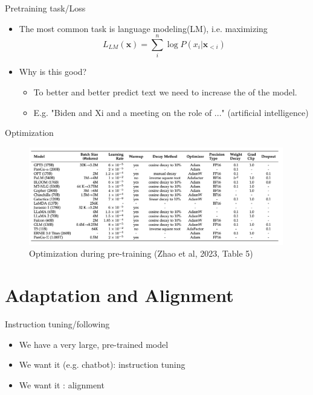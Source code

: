 \documentclass[10pt]{beamer}
\begin{document}
\begin{frame}{Pretraining task/Loss}

\begin{itemize}
\item The most common task is language modeling(LM), i.e. maximizing
\[
L_{LM}(\mathbf{x}) = \sum_i^n \log P(x_i | \mathbf{x}_{<i})
\]
\item Why is this good?
\begin{itemize}
\item To better and better predict text we need to increase the  of the model.
\item E.g. "Biden and Xi and a meeting on the role of ..." (artificial intelligence)
\end{itemize}
\end{itemize}


\end{frame}

\begin{frame}{Optimization}

\begin{figure}[h]
\centering
\includegraphics[width=0.99\textwidth]{fig/zhou_2023_tab5}
\caption{Optimization during pre-training (Zhao et al, 2023, Table 5)}
\end{figure}

\end{frame}



\section{Adaptation and Alignment}

\begin{frame}{Instruction tuning/following}

\begin{itemize}
\item We have a very large, pre-trained model
\item We want it  (e.g. chatbot): instruction tuning
\item We want it : alignment
\end{itemize}

\end{frame}
\end{document}
